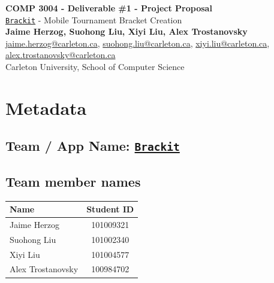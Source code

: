 \documentclass{article}
\begin{document}
\begin{center}


    \LARGE{\textbf{COMP 3004 - Deliverable \#1 - Project Proposal}} \\
    \vspace{1em}
    \Large{\href{https://github.com/alextrosta/brackit}{\texttt{Brackit}} - Mobile Tournament Bracket Creation} \\
    \vspace{1em}
    \normalsize\textbf{Jaime Herzog, Suohong Liu, Xiyi Liu, Alex Trostanovsky} \\
    \normalsize{
        \href{mailto:jaime.herzog@carleton.ca}{jaime.herzog@carleton.ca},
        \href{mailto:suohong.liu@carleton.ca}{suohong.liu@carleton.ca},
        \href{mailto:xiyi.liu@carleton.ca}{xiyi.liu@carleton.ca},
        \href{mailto:alex.trostanovsky@carleton.ca}{alex.trostanovsky@carleton.ca}
    } \\
    \vspace{1em}
    \normalsize{Carleton University, School of Computer Science} \\

\end{center}
\begin{normalsize}

\end{normalsize}

\section*{Metadata}
\subsection*{Team / App Name: \href{}{\texttt{Brackit}}}
\subsection*{Team member names}
\begin{center}
    \begin{tabular}{ |l|c| }
        \hline
        \textbf{Name}     & \textbf{Student ID} \\
        \hline
        Jaime Herzog      & 101009321           \\
        Suohong Liu       & 101002340           \\
        Xiyi Liu          & 101004577           \\
        Alex Trostanovsky & 100984702           \\
        \hline
    \end{tabular}
\end{center}
\end{document}
